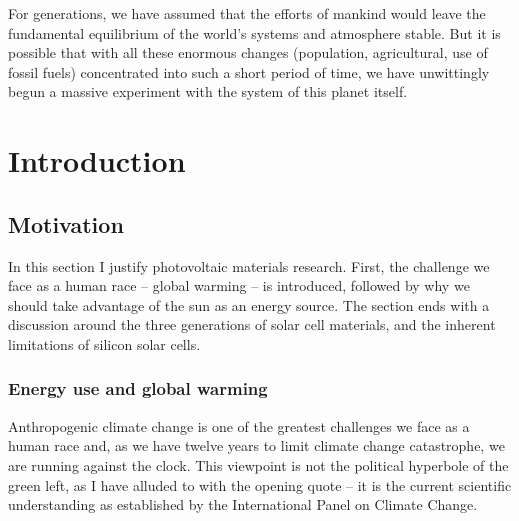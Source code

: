 \begin{savequote}[8cm]
For generations, we have assumed that the efforts of mankind would leave the fundamental equilibrium of the world's systems and atmosphere stable. But it is possible that with all these enormous changes (population, agricultural, use of fossil fuels) concentrated into such a short period of time, we have unwittingly begun a massive experiment with the system of this planet itself.
\end{savequote}

\chapter{\label{ch:1-intro}Introduction} 

\minitoc

\section{Motivation}

In this section I justify photovoltaic materials research. First, the challenge we face as a human race -- global warming -- is introduced, followed by why we should take advantage of the sun as an energy source. The section ends with a discussion around the three generations of solar cell materials, and the inherent limitations of silicon solar cells.

\subsection{Energy use and global warming}

Anthropogenic climate change is one of the greatest challenges we face as a human race and, as we have twelve years to limit climate change catastrophe, we are running against the clock. This viewpoint is not the political hyperbole of the green left, as I have alluded to with the opening quote -- it is the current scientific understanding as established by the International Panel on Climate Change.\autocite{IPCC2018}

